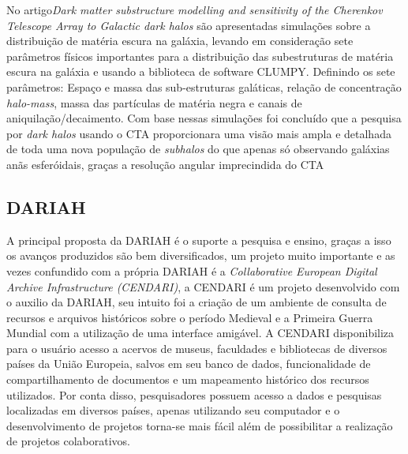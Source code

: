\documentclass[10pt, conference, compsocconf]{IEEEtran}
\begin{document}
No artigo\textit{Dark matter substructure modelling and sensitivity of the Cherenkov Telescope Array to Galactic dark halos} são apresentadas simulações sobre a distribuição de matéria escura na galáxia, levando em consideração sete parâmetros físicos importantes para a distribuição das subestruturas de matéria escura na galáxia e usando a biblioteca de software CLUMPY. Definindo os sete parâmetros: Espaço e massa das sub-estruturas galáticas, relação de concentração  \textit{halo-mass}, massa das partículas de matéria negra e canais de aniquilação/decaimento. Com base nessas simulações foi concluído que a pesquisa por \textit{dark halos} usando o CTA proporcionara uma visão mais ampla e detalhada de toda uma nova população de \textit{subhalos} do que apenas só observando galáxias anãs esferóidais, graças a resolução angular imprecindida do CTA
 \cite{H_tten_2016}

\subsection{DARIAH}
A principal proposta da DARIAH é o suporte a pesquisa e ensino, graças a isso os avanços produzidos são bem diversificados, um projeto muito importante e as vezes confundido com a própria DARIAH é a \textit{Collaborative European Digital Archive Infrastructure (CENDARI)}, a CENDARI é um projeto desenvolvido com o auxilio da DARIAH, seu intuito foi a criação de um ambiente de consulta de recursos e arquivos históricos sobre o período Medieval e a Primeira Guerra Mundial com a utilização de uma interface amigável. A CENDARI disponibiliza para o usuário acesso a acervos de museus, faculdades e bibliotecas de diversos países da União Europeia, salvos em seu banco de dados, funcionalidade de compartilhamento de documentos e um mapeamento histórico dos recursos utilizados. Por conta disso, pesquisadores possuem acesso a dados e pesquisas localizadas em diversos países, apenas utilizando seu computador e o desenvolvimento de projetos torna-se mais fácil além de possibilitar a realização de projetos colaborativos.\cite{DBLP:journals/corr/BoukhelifaBBCFK16}
\end{document}
